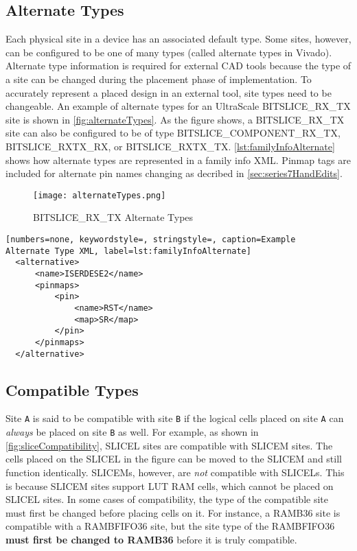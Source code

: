 \subsection{Alternate Types} \label{sec:alternateSites}
Each physical site in a device has an associated default type. Some sites,
however, can be configured to be one of many types (called alternate
types in Vivado). Alternate type information is required for external CAD tools because
the type of a site can be changed during the placement phase of implementation.
To accurately represent a placed design in an external tool, site types need to
be changeable. An example of alternate types for an UltraScale BITSLICE\_RX\_TX
site is shown in \autoref{fig:alternateTypes}. As the figure shows, a
BITSLICE\_RX\_TX site can also be configured to be of type
BITSLICE\_COMPONENT\_RX\_TX, BITSLICE\_RXTX\_RX, or BITSLICE\_RXTX\_TX.
\autoref{lst:familyInfoAlternate} shows how alternate types are
represented in a family info XML. Pinmap tags are included for alternate pin
names changing as decribed in \autoref{sec:series7HandEdits}.

\begin{figure}[b!]
  \centering
  \texttt{[image: alternateTypes.png]}
  \caption{BITSLICE\_RX\_TX Alternate Types}
  \label{fig:alternateTypes}
\end{figure}

\begin{lstlisting}[numbers=none, keywordstyle=, stringstyle=, caption=Example
Alternate Type XML, label=lst:familyInfoAlternate] 
  <alternative>
      <name>ISERDESE2</name>
      <pinmaps>
          <pin>
	          <name>RST</name>
              <map>SR</map>
	      </pin>
      </pinmaps>
  </alternative>
\end{lstlisting}

\subsection{Compatible Types}
Site \texttt{A} is said to be compatible with site \texttt{B} if the logical
cells placed on site \texttt{A} can \textit{always} be placed on site \texttt{B}
as well. For example, as shown in \autoref{fig:sliceCompatibility}, SLICEL sites
are compatible with SLICEM sites. The cells placed on the SLICEL in the figure
can be moved to the SLICEM and still function identically. SLICEMs, however,
are \textit{not} compatible with SLICELs. This is because SLICEM sites support
LUT RAM cells, which cannot be placed on SLICEL sites.  In some cases of
compatibility, the type of the compatible site must first be changed before
placing cells on it. For instance, a RAMB36 site is compatible with a
RAMBFIFO36 site, but the site type of the RAMBFIFO36 \textbf{must
first be changed to RAMB36} before it is truly compatible. 

